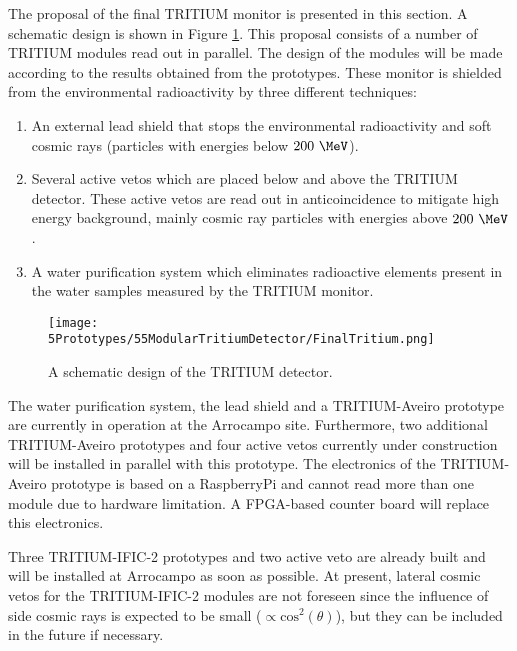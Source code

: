 The proposal of the final TRITIUM monitor is presented in this section. A schematic design is shown in Figure \ref{fig:TritiumDetectorSchematicDesign}. This proposal consists of a number of TRITIUM modules read out in parallel. The design of the modules will be made according to the results obtained from the prototypes. These monitor is shielded from the environmental radioactivity by three different techniques:

\begin{enumerate}

\item{} An external lead shield that stops the environmental radioactivity and soft cosmic rays (particles with energies below $200~\MeV$).

\item{} Several active vetos which are placed below and above the TRITIUM detector. These active vetos are read out in anticoincidence to mitigate high energy background, mainly cosmic ray particles with energies above $200~\MeV$.

\item{} A water purification system which eliminates radioactive elements present in the water samples measured by the TRITIUM monitor.

\end{enumerate}

\begin{figure}[h]
\centering
\texttt{[image: 5Prototypes/55ModularTritiumDetector/FinalTritium.png]}
\caption{A schematic design of the TRITIUM detector.\label{fig:TritiumDetectorSchematicDesign}}
\end{figure}

The water purification system, the lead shield and a TRITIUM-Aveiro prototype are currently in operation at the Arrocampo site. Furthermore, two additional TRITIUM-Aveiro prototypes and four active vetos currently under construction will be installed in parallel with this prototype. The electronics of the TRITIUM-Aveiro prototype is based on a RaspberryPi and cannot read more than one module due to hardware limitation. A FPGA-based counter board will replace this electronics.

Three TRITIUM-IFIC-2 prototypes and two active veto are already built and will be installed at Arrocampo as soon as possible. At present, lateral cosmic vetos for the TRITIUM-IFIC-2 modules are not foreseen since the influence of side cosmic rays is expected to be small ($\propto \text{cos}^2(\theta)$), but they can be included in the future if necessary.

